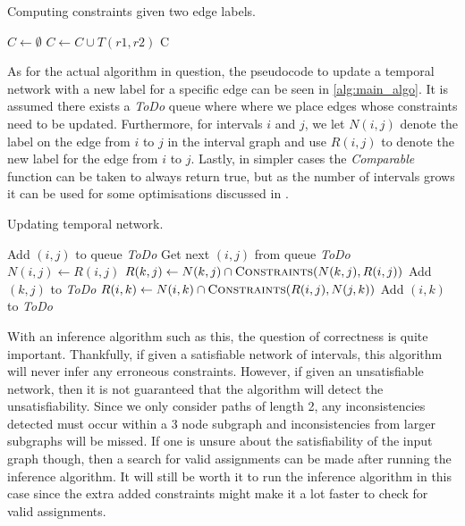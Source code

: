 \begin{algorithm}
  \caption{Computing constraints given two edge labels. \cite{allen83}}\label{alg:constraints}
  \begin{algorithmic}
    \State $C \gets \emptyset$
        \State $C \gets C \cup T(r1,r2)$
      \EndFor
    \EndFor
    \State \Return C
    \EndFunction
  \end{algorithmic}
\end{algorithm}

As for the actual algorithm in question,
the pseudocode to update a temporal network with a new label for a specific edge can be
seen in \cref{alg:main_algo}. It is assumed there exists a \textit{ToDo} queue
where where we place edges whose constraints need to be updated. Furthermore, for
intervals $i$ and $j$, we let $N(i,j)$ denote the label on the edge from $i$ to $j$ in the interval
graph and use $R(i,j)$ to denote the new label for the edge from $i$ to $j$.
Lastly, in simpler cases the \textit{Comparable} function can be taken to always return true, but
as the number of intervals grows it can be used for some optimisations discussed in
\cite[Chapter 5]{allen83}.

\begin{algorithm}
  \caption{Updating temporal network. \cite{allen83}}\label{alg:main_algo}
  \begin{algorithmic}
      \State Add $(i,j)$ to queue \textit{ToDo}
        \State Get next $(i,j)$ from queue \textit{ToDo}
        \State $N(i,j) \gets R(i,j)$
          \State $R(k, j) \gets N(k,j) \cap \Call{Constraints}{N(k,j), R(i,j)}$
            \State Add $(k,j)$ to \textit{ToDo}
          \EndIf
        \EndFor
          \State $R(i, k) \gets N(i,k) \cap \Call{Constraints}{R(i,j), N(j,k)}$
            \State Add $(i,k)$ to \textit{ToDo}
          \EndIf
        \EndFor
      \EndWhile
    \EndProcedure
  \end{algorithmic}
\end{algorithm}

With an inference algorithm such as this, the question of correctness is quite important.
Thankfully, if given a satisfiable network of intervals, this algorithm will never infer any
erroneous constraints. However, if given an unsatisfiable network, then it is not guaranteed that
the algorithm will detect the unsatisfiability. Since we only consider paths of length 2, any 
inconsistencies detected must occur within a 3 node subgraph and inconsistencies from larger
subgraphs will be missed. If one is unsure about the satisfiability of the input graph though,
then a search for valid assignments can be made after running the inference algorithm. It will
still be worth it to run the inference algorithm in this case since the extra added constraints
might make it a lot faster to check for valid assignments.

